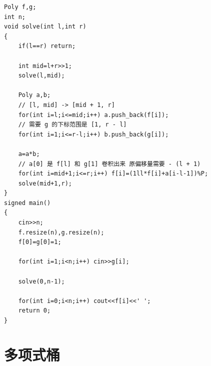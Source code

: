 \begin{verbatim}
Poly f,g;
int n;
void solve(int l,int r)
{
    if(l==r) return;

    int mid=l+r>>1;
    solve(l,mid);

    Poly a,b;
    // [l, mid] -> [mid + 1, r]
    for(int i=l;i<=mid;i++) a.push_back(f[i]);
    // 需要 g 的下标范围是 [1, r - l]
    for(int i=1;i<=r-l;i++) b.push_back(g[i]);

    a=a*b;
    // a[0] 是 f[l] 和 g[1] 卷积出来 原偏移量需要 - (l + 1)
    for(int i=mid+1;i<=r;i++) f[i]=(1ll*f[i]+a[i-l-1])%P;
    solve(mid+1,r);
}
signed main()
{
    cin>>n;
    f.resize(n),g.resize(n);
    f[0]=g[0]=1;

    for(int i=1;i<n;i++) cin>>g[i];

    solve(0,n-1);

    for(int i=0;i<n;i++) cout<<f[i]<<' ';
    return 0;
}
\end{verbatim}

\section{多项式桶}

